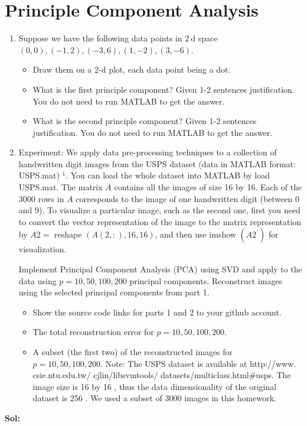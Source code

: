 \documentclass[11pt]{article}
\begin{document}
\section{Principle Component Analysis}

\begin{enumerate}
	\item  Suppose we have the following data points in $2 \mathrm{~d}$ space $(0,0),(-1,2),(-3,6),(1,-2),(3,-6)$.
	\begin{itemize}
\item Draw them on a 2-d plot, each data point being a dot.
\item  What is the first principle component? Given 1-2 sentences justification. You do not need to run MATLAB to get the answer.
\item  What is the second principle component? Given 1-2 sentences justification. You do not need to run MATLAB to get the answer.
\end{itemize}

\item  Experiment: We apply data pre-processing techniques to a collection of handwritten digit images from the USPS dataset (data in MATLAB format: USPS.mat) ${ }^1$. You can load the whole dataset into MATLAB by load USPS.mat. The matrix $A$ contains all the images of size 16 by 16. Each of the 3000 rows in $A$ corresponds to the image of one handwritten digit (between 0 and 9). To visualize a particular image, such as the second one, first you need to convert the vector representation of the image to the matrix representation by $A 2=$ reshape $(A(2,:), 16,16)$, and then use imshow $\left(A 2^{\prime}\right)$ for visualization.

Implement Principal Component Analysis (PCA) using SVD and apply to the data using $p=10,50,100,200$ principal components. Reconstruct images using the selected principal components from part 1.

\begin{itemize}
\item Show the source code links for parts 1 and 2 to your github account.
\item  The total reconstruction error for $p=10,50,100,200$.
\item  A subset (the first two) of the reconstructed images for $p=10,50,100,200$.
Note: The USPS dataset is available at http://www. csie.ntu.edu.tw/ cjlin/libsvmtools/ datasets/multiclass.html\#usps. The image size is 16 by 16 , thus the data dimensionality of the original dataset is 256 . We used a subset of 3000 images in this homework.
\end{itemize}
\end{enumerate}

\textbf{Sol:}
\end{document}
